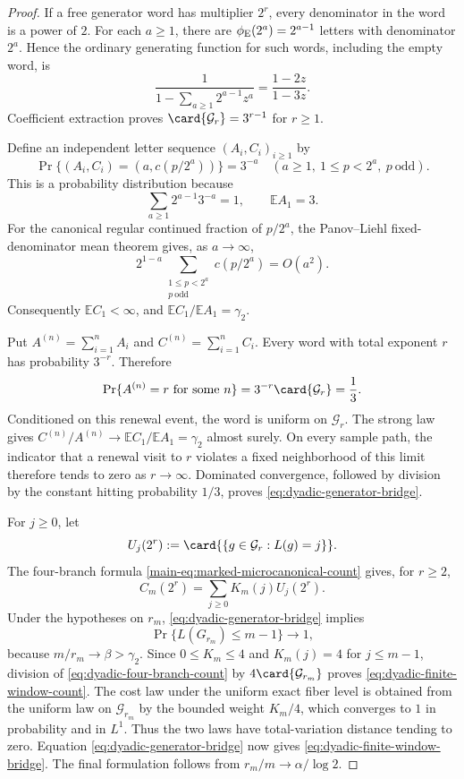 \begin{proof}
If a free generator word has multiplier \(2^r\), every denominator in the
word is a power of \(2\).  For each \(a\ge1\), there are
\(\phi_{\rm E}(2^a)=2^{a-1}\) letters with denominator \(2^a\).  Hence the
ordinary generating function for such words, including the empty word, is
\[
 \frac1{1-\sum_{a\ge1}2^{a-1}z^a}
 =\frac{1-2z}{1-3z}.
\]
Coefficient extraction proves \(\card{\mathcal G_r}=3^{r-1}\) for \(r\ge1\).

Define an independent letter sequence \((A_i,C_i)_{i\ge1}\) by
\[
 \Pr\{(A_i,C_i)=(a,c(p/2^a))\}=3^{-a}
 \quad(a\ge1,\ 1\le p<2^a,\ p\ \mathrm{odd}).
\]
This is a probability distribution because
\[
 \sum_{a\ge1}2^{a-1}3^{-a}=1,
 \qquad \mathbb E A_1=3.
\]
For the canonical regular continued fraction of \(p/2^a\), the
Panov--Liehl fixed-denominator mean theorem
\cite{Panov1982,Liehl1983,AistleitnerBordaHauke2023} gives, as \(a\to\infty\),
\[
 2^{1-a}\sum_{\substack{1\le p<2^a\\p\ \mathrm{odd}}}
 c(p/2^a)=O(a^2).
\]
Consequently \(\mathbb E C_1<\infty\), and
\(\mathbb E C_1/\mathbb E A_1=\gamma_2\).

Put \(A^{(n)}=\sum_{i=1}^nA_i\) and
\(C^{(n)}=\sum_{i=1}^nC_i\).  Every word with total exponent \(r\) has
probability \(3^{-r}\).  Therefore
\[
 \Pr\{A^{(n)}=r\text{ for some }n\}
 =3^{-r}\card{\mathcal G_r}=\frac13.
\]
Conditioned on this renewal event, the word is uniform on \(\mathcal G_r\).
The strong law gives
\(C^{(n)}/A^{(n)}\to\mathbb E C_1/\mathbb E A_1=\gamma_2\) almost surely.
On every sample path, the indicator that a renewal visit to \(r\) violates a
fixed neighborhood of this limit therefore tends to zero as \(r\to\infty\).
Dominated convergence, followed by division by the constant hitting
probability \(1/3\), proves \eqref{eq:dyadic-generator-bridge}.

For \(j\ge0\), let
\[
 U_j(2^r):=\card{\{g\in\mathcal G_r:L(g)=j\}}.
\]
The four-branch formula \eqref{main-eq:marked-microcanonical-count} gives, for
\(r\ge2\),
\begin{equation}
 C_m(2^r)=\sum_{j\ge0}K_m(j)U_j(2^r).
 \label{eq:dyadic-four-branch-count}
\end{equation}
Under the hypotheses on \(r_m\),
\eqref{eq:dyadic-generator-bridge} implies
\[
 \Pr\{L(G_{r_m})\le m-1\}\longrightarrow1,
\]
because \(m/r_m\to\beta>\gamma_2\).  Since \(0\le K_m\le4\) and
\(K_m(j)=4\) for \(j\le m-1\), division of
\eqref{eq:dyadic-four-branch-count} by \(4\card{\mathcal G_{r_m}}\) proves
\eqref{eq:dyadic-finite-window-count}.  The cost law under the uniform exact
fiber level is obtained from the uniform law on \(\mathcal G_{r_m}\) by the
bounded weight \(K_m/4\), which converges to \(1\) in probability and in
\(L^1\).  Thus the two laws have total-variation distance tending to zero.
Equation \eqref{eq:dyadic-generator-bridge} now gives
\eqref{eq:dyadic-finite-window-bridge}.  The final formulation follows from
\(r_m/m\to\alpha/\log2\).
\end{proof}

